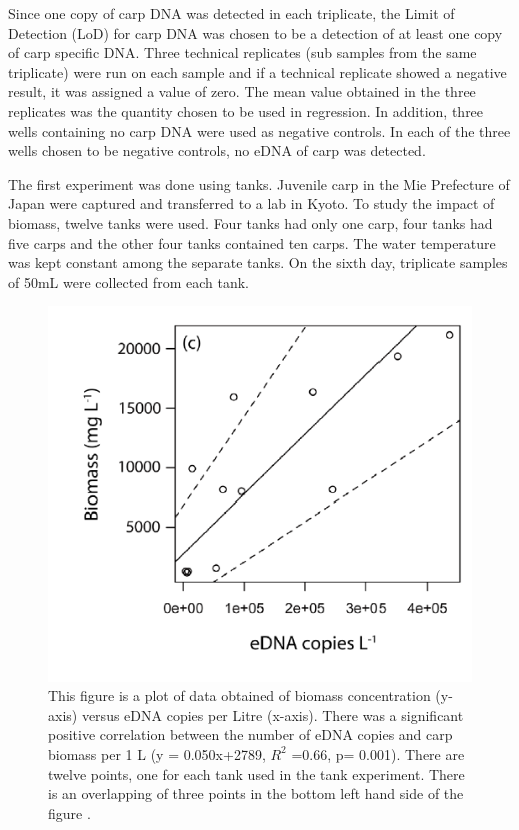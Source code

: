\vspace{5mm}

Since one copy of carp DNA was detected in each triplicate, the Limit of Detection (LoD) for carp DNA was chosen to be a detection of at least one copy of carp specific DNA. Three technical replicates (sub samples from the same triplicate) were run on each sample and if a technical replicate showed a negative result, it was assigned a value of zero. The mean value obtained in the three replicates was the quantity chosen to be used in regression. In addition, three wells containing no carp DNA were used as negative controls. In each of the three wells chosen to be negative controls, no eDNA of carp was detected.

\vspace{5mm}

The first experiment was done using tanks. Juvenile carp in the Mie Prefecture of Japan were captured and transferred to a lab in Kyoto.
To study the impact of biomass, twelve tanks were used.  Four tanks had only one carp, four tanks had five carps and the other four tanks contained ten carps. The water temperature was kept constant among the separate tanks. On the sixth day, triplicate samples of 50mL were collected from each tank. 


\begin{figure}[H]
\includegraphics{Chapter2Images/eDNAcopies.png} 
\caption{This figure is a plot of data obtained of biomass concentration (y-axis) versus eDNA copies per Litre (x-axis). There was a
significant positive correlation between the number of eDNA
copies and carp biomass per 1 L (y = 0.050x+2789, $R^{2}$ =0.66,
p= 0.001). There are twelve points, one for each tank used in the tank experiment. There is an overlapping of three points in the bottom left hand side of the figure
 \citep{biomass}.}
\label{fig:copies}
\end{figure}


